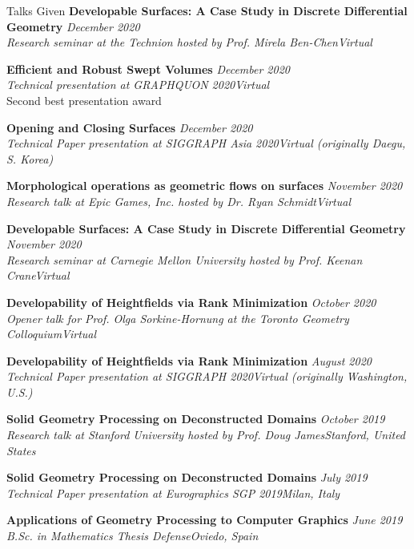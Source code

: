 \documentclass{resume} %
\begin{document}
\begin{rSection}{Talks Given}
{\bf Developable Surfaces: A Case Study in Discrete Differential Geometry} \hfill {\em December 2020}\\ 
{\it Research seminar at the Technion hosted by Prof. Mirela Ben-Chen}\hfill {\em Virtual}

{\bf Efficient and Robust Swept Volumes} \hfill {\em December 2020}\\ 
{\it Technical presentation at GRAPHQUON 2020}\hfill {\em Virtual}\\
{Second best presentation award}

{\bf Opening and Closing Surfaces} \hfill {\em December 2020}\\ 
{\it Technical Paper presentation at SIGGRAPH Asia 2020}\hfill {\em Virtual (originally Daegu, S. Korea)}

{\bf Morphological operations as geometric flows on surfaces} \hfill {\em November 2020}\\ 
{\it Research talk at Epic Games, Inc. hosted by Dr. Ryan Schmidt}\hfill {\em Virtual}

{\bf Developable Surfaces: A Case Study in Discrete Differential Geometry} \hfill {\em November 2020}\\ 
{\it Research seminar at Carnegie Mellon University hosted by Prof. Keenan Crane}\hfill {\em Virtual}

{\bf Developability of Heightfields via Rank Minimization} \hfill {\em October 2020}\\ 
{\it Opener talk for Prof. Olga Sorkine-Hornung at the Toronto Geometry Colloquium}\hfill {\em Virtual}

{\bf Developability of Heightfields via Rank Minimization} \hfill {\em August 2020}\\ 
{\it Technical Paper presentation at SIGGRAPH 2020}\hfill {\em Virtual (originally Washington, U.S.)}

{\bf Solid Geometry Processing on Deconstructed Domains} \hfill {\em October 2019}\\ 
{\it Research talk at Stanford University hosted by Prof. Doug James}\hfill {\em Stanford, United States}

{\bf Solid Geometry Processing on Deconstructed Domains} \hfill {\em July 2019}\\ 
{\it Technical Paper presentation at Eurographics SGP 2019}\hfill {\em Milan, Italy}

{\bf Applications of Geometry Processing to Computer Graphics} \hfill {\em June 2019}\\ 
{\it B.Sc. in Mathematics Thesis Defense}\hfill {\em Oviedo, Spain}


\end{rSection}
\end{document}
